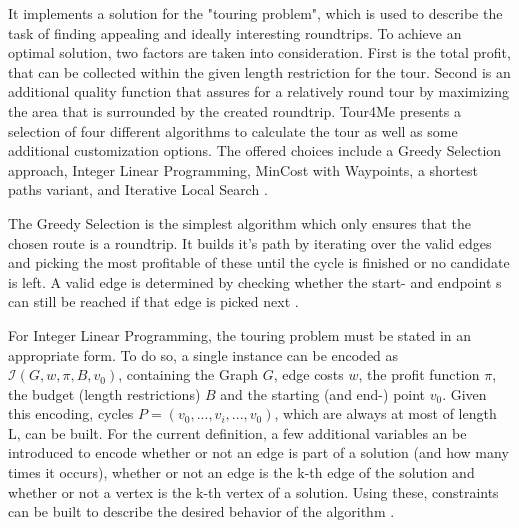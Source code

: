 
It implements a solution for the "touring problem", which is used to describe the task of finding appealing and ideally interesting roundtrips.
To achieve an optimal solution, two factors are taken into consideration.
First is the total profit, that can be collected within the given length restriction for the tour.
Second is an additional quality function that assures for a relatively round tour by maximizing the area that is surrounded by the created roundtrip.
Tour4Me presents a selection of four different algorithms to calculate the tour as well as some additional customization options.
The offered choices include a Greedy Selection approach, Integer Linear Programming, MinCost with Waypoints, a shortest paths variant, and Iterative Local Search \cite{buchinTour4MeFrameworkCustomized2022a}. 

The Greedy Selection is the simplest algorithm which only ensures that the chosen route is a roundtrip.
It builds it's path by iterating over the valid edges and picking the most profitable of these until the cycle is finished or no candidate is left.
A valid edge is determined by checking whether the start- and endpoint s can still be reached if that edge is picked next \cite{buchinTour4MeFrameworkCustomized2022a}.


For Integer Linear Programming, the touring problem must be stated in an appropriate form.
To do so, a single instance can be encoded as $\mathcal{I}(G, w, \pi, B, v_0)$, containing the Graph $G$, edge costs $w$, the profit function $\pi$, the budget (length restrictions) $B$ and the starting (and end-) point $v_0$.
Given this encoding, cycles $P=(v_0,...,v_i,...,v_0)$, which are always at most of length L, can be built.
For the current definition, a few additional variables an be introduced to encode whether or not an edge is part of a solution (and how many times it occurs), whether or not an edge is the k-th edge of the solution and whether or not a vertex is the k-th vertex of a solution. 
Using these, constraints can be built to describe the desired behavior of the algorithm \cite{buchinTour4MeFrameworkCustomized2022a}.

